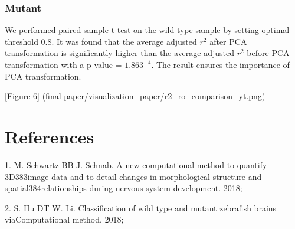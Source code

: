 \documentclass[10pt,letterpaper]{article}
\begin{document}
\subsubsection{Mutant}\label{mutant-1}

We performed paired sample t-test on the wild type sample by setting
optimal threshold 0.8. It was found that the average adjusted \(r^2\)
after PCA transformation is significantly higher than the average
adjusted \(r^2\) before PCA transformation with a p-value =
\(1.863^{-4}\). The result ensures the importance of PCA transformation.

{[}Figure 6{]} (final
paper/visualization\_paper/r2\_ro\_comparison\_yt.png)

\section*{References}\label{references}

\hypertarget{refs}{}
\hypertarget{ref-Schwartz18}{}
1. M. Schwartz BB J. Schnab. A new computational method to quantify
3D383image data and to detail changes in morphological structure and
spatial384relationships during nervous system development. 2018;

\hypertarget{ref-Hu18}{}
2. S. Hu DT W. Li. Classification of wild type and mutant zebrafish
brains viaComputational method. 2018;

\nolinenumbers
\end{document}
